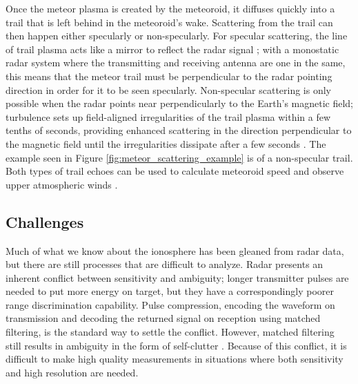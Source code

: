 Once the meteor plasma is created by the meteoroid, it diffuses quickly into a trail that is left behind in the meteoroid's wake. Scattering from the trail can then happen either specularly or non-specularly. For specular scattering, the line of trail plasma acts like a mirror to reflect the radar signal \autocite{Sug64}; with a monostatic radar system where the transmitting and receiving antenna are one in the same, this means that the meteor trail must be perpendicular to the radar pointing direction in order for it to be seen specularly. Non-specular scattering is only possible when the radar points near perpendicularly to the Earth's magnetic field; turbulence sets up field-aligned irregularities of the trail plasma within a few tenths of seconds, providing enhanced scattering in the direction perpendicular to the magnetic field until the irregularities dissipate after a few seconds \autocite{DOCH02}. The example seen in Figure \ref{fig:meteor_scattering_example} is of a non-specular trail. Both types of trail echoes can be used to calculate meteoroid speed \autocite{CES97, DDC+04} and observe upper atmospheric winds \autocite{HFV01, OSS+09}.

\subsection{Challenges}
\label{intro_radar_challenges}
Much of what we know about the ionosphere has been gleaned from radar data, but there are still processes that are difficult to analyze. Radar presents an inherent conflict between sensitivity and ambiguity; longer transmitter pulses are needed to put more energy on target, but they have a correspondingly poorer range discrimination capability. Pulse compression, encoding the waveform on transmission and decoding the returned signal on reception using matched filtering, is the standard way to settle the conflict. However, matched filtering still results in ambiguity in the form of self-clutter \autocite{Woo80}. Because of this conflict, it is difficult to make high quality measurements in situations where both sensitivity and high resolution are needed.

